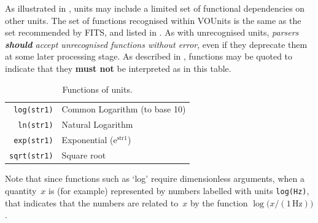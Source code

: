 \documentclass[11pt,notitlepage,onecolumn]{ivoa}
\newcommand*\norm[1]{\textbf{\color{ivoacolor}#1}}
\def\eg{e.g.,~}
\newcommand{\unit}[1]{\texttt{\small\color{orange}#1}}
\begin{document}
As illustrated in , units may include a
limited set of functional dependencies on other units.  The set of
functions recognised within VOUnits is the same as the set recommended
by FITS, and listed in .  As with
unrecognised units,
\emph{parsers \norm{should} accept unrecognised functions without error},
even if they deprecate them at some later processing stage.  As
described in , functions may be quoted to
indicate that they \norm{must not} be interpreted as in this table.
\begin{table}%
\begin{center}
\def\arraystretch{1.2}
\begin{tabular}{|r|l|}
\hline
\unit{log(str1)} & Common Logarithm (to base 10) \\
\unit{ln(str1)} & Natural Logarithm \\
\unit{exp(str1)} & Exponential (e$^{\mathrm{str1}}$) \\
\unit{sqrt(str1)} & Square root \\
\hline
\end{tabular}
\end{center}
\caption{\label{tab:functions}Functions of units.}
\end{table}
Note that since functions such as `log' require dimensionless
arguments, when a quantity~$x$ is (for example) represented by numbers
labelled with units \unit{log(Hz)}, that indicates that the numbers
are related to~$x$ by the function
$\log\bigl(x/(\mathrm{1\,Hz})\bigr)$.

%
%
%
%
\end{document}
